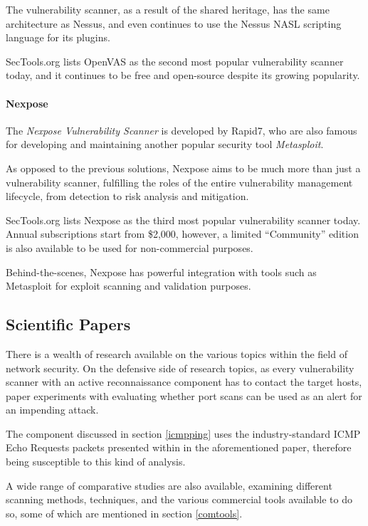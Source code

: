 \documentclass[a4paper,12pt]{article}
\begin{document}
	The vulnerability scanner, as a result of the shared heritage, has the same architecture as Nessus, and even continues to use the Nessus NASL scripting language for its plugins.
	
	SecTools.org lists OpenVAS as the second most popular vulnerability scanner today, and it continues to be free and open-source despite its growing popularity.
	
	\paragraph*{Nexpose} The \textit{Nexpose Vulnerability Scanner}\cite{nexpose} is developed by Rapid7, who are also famous for developing and maintaining another popular security tool \textit{Metasploit}.
	
	As opposed to the previous solutions, Nexpose aims to be much more than just a vulnerability scanner, fulfilling the roles of the entire vulnerability management lifecycle, from detection to risk analysis and mitigation.
	
	SecTools.org lists Nexpose as the third most popular vulnerability scanner today. Annual subscriptions start from \$2,000, however, a limited ``Community'' edition is also available to be used for non-commercial purposes.
	
	Behind-the-scenes, Nexpose has powerful integration with tools such as Metasploit for exploit scanning and validation purposes.
	
\subsection{Scientific Papers}
 
	
	There is a wealth of research available on the various topics within the field of network security. On the defensive side of research topics, as every vulnerability scanner with an active reconnaissance component has to contact the target hosts, paper \cite{panjwani05} experiments with evaluating whether port scans can be used as an alert for an impending attack.
	
	The component discussed in section \ref{icmpping} uses the industry-standard ICMP Echo Requests packets presented within in the aforementioned paper, therefore being susceptible to this kind of analysis.
	
	A wide range of comparative studies are also available, examining different scanning methods, techniques, and the various commercial tools available to do so, some of which are mentioned in section \ref{comtools}.
	
\end{document}
